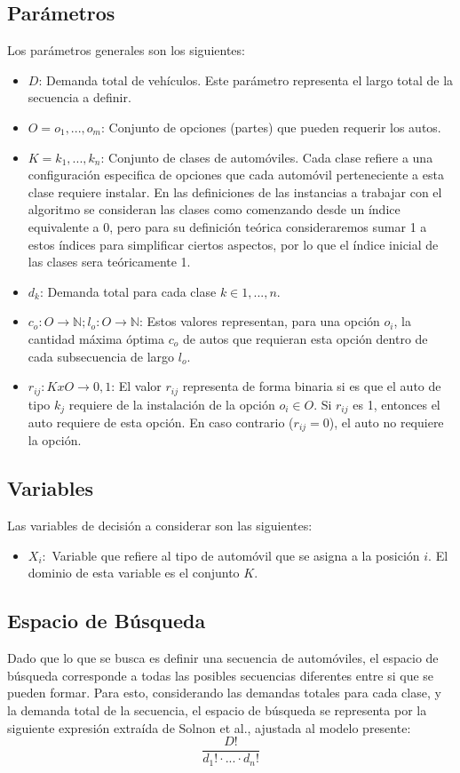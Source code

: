 \documentclass[letter, 10pt]{article}
\begin{document}
\subsection{Parámetros}
Los parámetros generales son los siguientes:
\begin{itemize}
    \item $D$: Demanda total de vehículos. Este parámetro representa el largo total de la secuencia a definir.
    \item $O = {o_1, ... , o_m}$: Conjunto de opciones (partes) que pueden requerir los autos.
    \item $K = {k_1, ... , k_n}$: Conjunto de clases de automóviles. Cada clase refiere a una configuración especifica de opciones que cada automóvil perteneciente a esta clase requiere instalar. En las definiciones de las instancias a trabajar con el algoritmo se consideran las clases como comenzando desde un índice equivalente a 0, pero para su definición teórica consideraremos sumar 1 a estos índices para simplificar ciertos aspectos, por lo que el índice inicial de las clases sera teóricamente 1.
    \item $d_k$: Demanda total para cada clase $k \in {1, ..., n}$.
    \item $c_o: O \xrightarrow{} \mathds{N}; l_o: O \xrightarrow{} \mathds{N}$: Estos valores representan, para una opción $o_i$, la cantidad máxima óptima $c_o$ de autos que requieran esta opción dentro de cada subsecuencia de largo $l_o$.
    \item $r_{ij}: K x O \xrightarrow{} {0,1}$: El valor $r_{ij}$ representa de forma binaria si es que el auto de tipo $k_j$ requiere de la instalación de la opción $o_i \in O$. Si $r_{ij}$ es 1, entonces el auto requiere de esta opción. En caso contrario ($r_{ij} = 0$), el auto no requiere la opción.
\end{itemize}

\subsection{Variables}
Las variables de decisión a considerar son las siguientes:
\begin{itemize}
    \item $X_i:$ Variable que refiere al tipo de automóvil que se asigna a la posición $i$. El dominio de esta variable es el conjunto $K$.
\end{itemize}

\subsection{Espacio de Búsqueda}
Dado que lo que se busca es definir una secuencia de automóviles, el espacio de búsqueda corresponde a todas las posibles secuencias diferentes entre si que se pueden formar. Para esto, considerando las demandas totales para cada clase, y la demanda total de la secuencia, el espacio de búsqueda se representa por la siguiente expresión extraída de Solnon et al., ajustada al modelo presente:
\begin{equation*}
    \frac{D!}{d_1!\cdot ... \cdot d_n!}
\end{equation*}
\end{document}
